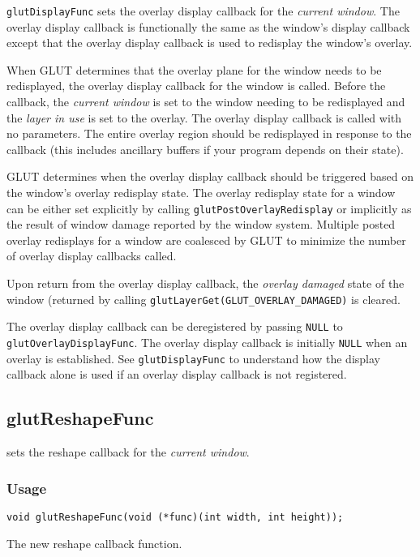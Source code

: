 {\tt glutDisplayFunc} sets the overlay display callback for the {\em current
window}.  The overlay display callback is functionally the same as the window's display callback
except that the overlay display callback is used to redisplay the window's overlay.

When GLUT determines that the overlay plane for the window needs
to be redisplayed, the overlay display callback for the window is called.  Before the callback,
the {\em current window} is set to the window needing to be
redisplayed and the {\em layer in use} is set to the overlay.  The overlay display callback
is called with no parameters.  The
entire overlay region should be redisplayed in response to the callback (this
includes ancillary buffers if your program depends on their state).

GLUT determines when the overlay display callback should be triggered based on
the window's overlay redisplay state.  The overlay redisplay state for a window can
be either set explicitly by calling {\tt glutPostOverlayRedisplay} or implicitly
as the result of window damage reported by the window system.
Multiple posted overlay redisplays for a window are
coalesced by GLUT to minimize the number of overlay display callbacks called.

Upon return from the overlay display callback, the {\em overlay damaged} state of the
window (returned by calling {\tt glutLayerGet(GLUT\_OVERLAY\_DAMAGED)}
is cleared.

The overlay display callback can be deregistered by passing {\tt NULL} to
{\tt glutOverlayDisplayFunc}.  The overlay display callback is initially {\tt NULL}
when an overlay is established.
See {\tt glutDisplayFunc} to understand how the
display callback alone is used if an overlay display callback is not registered.

\subsection{glutReshapeFunc}

 sets the reshape callback for the {\em current window}.

\subsubsection*{Usage}
\begin{verbatim}
void glutReshapeFunc(void (*func)(int width, int height));
\end{verbatim}
\begin{description}
\itemsep 0in
\item[{\tt func}]
The new reshape callback function.
\end{description}

